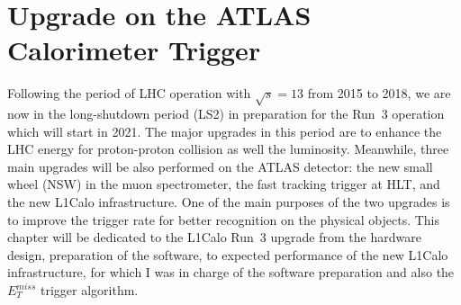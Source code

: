 \chapter{Upgrade on the ATLAS Calorimeter Trigger}
Following the period of LHC operation with $\sqrt{s}=13$ from 2015 to 2018, we are now in the long-shutdown period (LS2) in preparation for the Run~3 operation which will start in 2021. The major upgrades in this period are to enhance the LHC energy for proton-proton collision as well the luminosity. Meanwhile, three main upgrades will be also performed on the ATLAS detector: the new small wheel (NSW) in the muon spectrometer\cite{STELZER20161160}, the fast tracking trigger at HLT\cite{Shochet:1552953}, and the new L1Calo infrastructure. One of the main purposes of the two upgrades is to improve the trigger rate for better recognition on the physical objects. This chapter will be dedicated to the L1Calo Run~3 upgrade from the hardware design, preparation of the software, to expected performance of the new L1Calo infrastructure, for which I was in charge of the software preparation and also the $E^{miss}_{T}$ trigger algorithm. 

